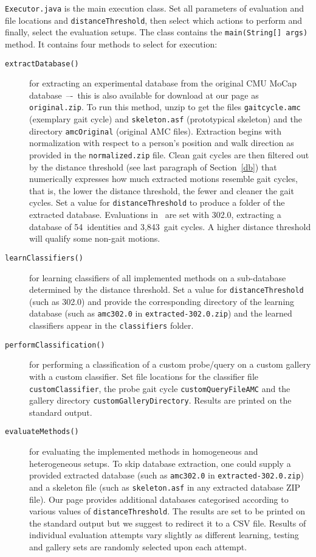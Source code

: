 \documentclass[10pt,a4paper]{llncs}
\begin{document}
\texttt{Executor.java} is the main execution class. Set all parameters of evaluation and  file locations and \texttt{distanceThreshold}, then select which actions to perform and finally, select the evaluation setups. The class contains the \texttt{main(String[] args)} method. It contains four methods to select for execution:
\begin{description}
\item[\texttt{extractDatabase()}] for extracting an experimental database from the original CMU MoCap database~–-~this is also available for download at our page as \texttt{original.zip}. To run this method, unzip to get the files \texttt{gaitcycle.amc} (exemplary gait cycle) and \texttt{skeleton.asf} (prototypical skeleton) and the directory \texttt{amcOriginal} (original AMC files). Extraction begins with normalization with respect to a person’s position and walk direction as provided in the \texttt{normalized.zip} file. Clean gait cycles are then filtered out by the distance threshold (see last paragraph of Section~\ref{db}) that numerically expresses how much extracted motions resemble gait cycles, that is, the lower the distance threshold, the fewer and cleaner the gait cycles. Set a value for \texttt{distanceThreshold} to produce a folder of the extracted database. Evaluations in~\cite{BS16a,BS16b} are set with 302.0, extracting a database of 54~identities and 3{,}843~gait cycles. A higher distance threshold will qualify some non-gait motions.
\item[\texttt{learnClassifiers()}] for learning classifiers of all implemented methods on a sub-database determined by the distance threshold. Set a value for \texttt{distanceThreshold} (such as 302.0) and provide the corresponding directory of the learning database (such as \texttt{amc302.0} in \texttt{extracted-302.0.zip}) and the learned classifiers appear in the \texttt{classifiers} folder.
\item[\texttt{performClassification()}] for performing a classification of a custom probe/query on a custom gallery with a custom classifier. Set file locations for the classifier file \texttt{customClassifier}, the probe gait cycle \texttt{customQueryFileAMC} and the gallery directory \texttt{customGalleryDirectory}. Results are printed on the standard output.
\item[\texttt{evaluateMethods()}] for evaluating the implemented methods in homogeneous and heterogeneous setups. To skip database extraction, one could supply a provided extracted database (such as \texttt{amc302.0} in \texttt{extracted-302.0.zip}) and a skeleton file (such as \texttt{skeleton.asf} in any extracted database ZIP file). Our page provides additional databases categorised according to various values of \texttt{distanceThreshold}. The results are set to be printed on the standard output but we suggest to redirect it to a CSV file. Results of individual evaluation attempts vary slightly as different learning, testing and gallery sets are randomly selected upon each attempt.
\end{description}
\end{document}
